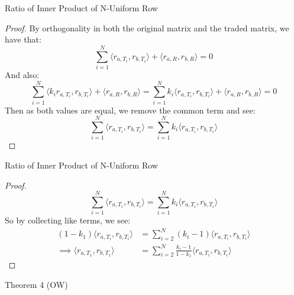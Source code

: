 \documentclass{beamer}
\begin{document}
\begin{frame}{Ratio of Inner Product of N-Uniform Row}
    \begin{proof}
        By orthogonality in both the original matrix and the traded matrix, we have that: 
    $$\sum_{i=1}^N\langle r_{a,T_i},r_{b,T_i}\rangle + \langle r_{a,R},r_{b,R}\rangle=0$$
    And also:
    $$\sum_{i=1}^N\langle k_ir_{a,T_i},r_{b,T_i}\rangle + \langle r_{a,R},r_{b,R}\rangle=\sum_{i=1}^Nk_i\langle r_{a,T_i},r_{b,T_i}\rangle + \langle r_{a,R},r_{b,R}\rangle=0$$
    Then as both values are equal, we remove the common term and see:
    $$\sum_{i=1}^N\langle r_{a,T_i},r_{b,T_i}\rangle = \sum_{i=1}^Nk_i\langle r_{a,T_i},r_{b,T_i}\rangle$$
    \end{proof}
\end{frame}
\begin{frame}{Ratio of Inner Product of N-Uniform Row}
\begin{proof}
    $$\sum_{i=1}^N\langle r_{a,T_i},r_{b,T_i}\rangle = \sum_{i=1}^Nk_i\langle r_{a,T_i},r_{b,T_i}\rangle$$
    So by collecting like terms, we see:
    \begin{align*}
        (1-k_1)\langle r_{a,T_i},r_{b,T_i}\rangle&=\sum_{i=2}^N(k_i-1)\langle r_{a,T_i},r_{b,T_i}\rangle\\\implies \langle r_{a,T_1},r_{b,T_1}\rangle&=\sum_{i=2}^N\frac{k_i-1}{1-k_1}\langle r_{a,T_i},r_{b,T_i}\rangle
    \end{align*}
\end{proof}
\end{frame}


\begin{frame}{Theorem 4 (OW)}%
    \begin{theorem}[Theorem 4]
        
    \end{theorem}
\end{frame}
\end{document}

